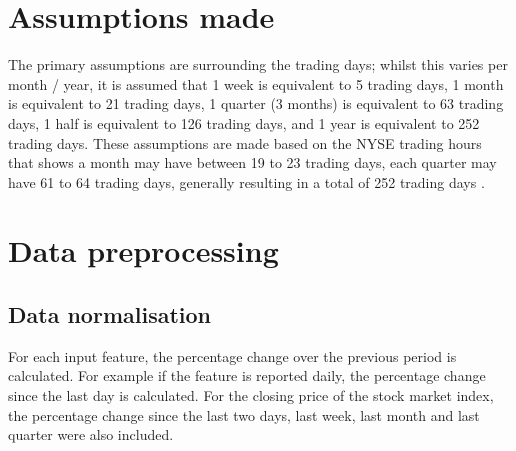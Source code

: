 \section{Assumptions made}
The primary assumptions are surrounding the trading days; whilst this varies per month / year, it is assumed
that 1 week is equivalent to 5 trading days, 1 month is equivalent to 21 trading days, 1 quarter (3 months)
is equivalent to 63 trading days, 1 half is equivalent to 126 trading days, and 1 year is equivalent to 252
trading days. These assumptions are made based on the NYSE trading hours that shows a month may have
between 19 to 23 trading days, each quarter may have 61 to 64 trading days, generally resulting in a total
of 252 trading days \parencite{nyse_2020}.

\section{Data preprocessing}
\subsection{Data normalisation}
For each input feature, the percentage change over the previous period is calculated. For example if the feature
is reported daily, the percentage change since the last day is calculated. For the closing price of the stock
market index, the percentage change since the last two days, last week, last month and last quarter were also
included.


